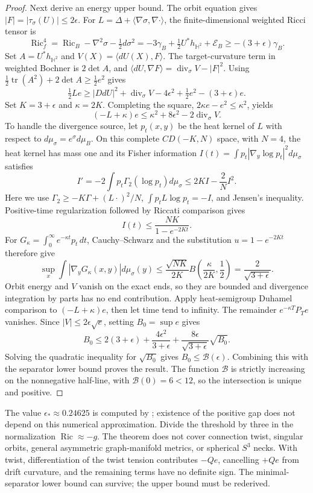 \documentclass[a4paper,11pt]{article}
\numberwithin{equation}{section}
\theoremstyle{definition}
\newcommand{\Ric}{\operatorname{Ric}}
\newcommand{\tr}{\operatorname{tr}}
\begin{document}
\begin{proof}
Next derive an energy upper bound.
The orbit equation gives $|F|=|\tau_\sigma(U)|\le2\epsilon$.
For $L=\Delta+\langle\nabla\sigma,\nabla\cdot\rangle$, the finite-dimensional weighted Ricci tensor is
\[
 \Ric^4_f=\Ric_B-\nabla^2\sigma-\tfrac12d\sigma^2
 =-3\gamma_B+\tfrac12U^*h_{\mathbb H^2}+\mathcal E_B
 \ge-(3+\epsilon)\gamma_B.
\]
Set $A=U^*h_{\mathbb H^2}$ and $V(X)=\langle dU(X),F\rangle$.
The target-curvature term in weighted Bochner is $2\det A$, and
$\langle dU,\nabla F\rangle=\operatorname{div}_\sigma V-|F|^2$.
Using $\frac12\tr(A^2)+2\det A\ge\frac12e^2$ gives
\[
 \tfrac12Le\ge |DdU|^2+\operatorname{div}_\sigma V
   -4\epsilon^2+\tfrac12e^2-(3+\epsilon)e.
\]
Set $K=3+\epsilon$ and $\kappa=2K$. Completing the square, $2\kappa e-e^2\le\kappa^2$, yields
\[
 (-L+\kappa)e\le\kappa^2+8\epsilon^2
                 -2\operatorname{div}_\sigma V.
\]
To handle the divergence source, let $p_t(x,y)$ be the heat kernel of $L$ with respect to $d\mu_\sigma=e^\sigma d\mu_B$.
On this complete $CD(-K,N)$ space, with $N=4$, the heat kernel has mass one and its Fisher information
$I(t)=\int p_t|\nabla_y\log p_t|^2d\mu_\sigma$ satisfies
\[
 I'=-2\int p_t\Gamma_2(\log p_t)d\mu_\sigma
 \le2KI-\frac2N I^2.
\]
Here we use $\Gamma_2\ge-K\Gamma+(L\cdot)^2/N$,
$\int p_tL\log p_t=-I$, and Jensen's inequality.
Positive-time regularization followed by Riccati comparison gives
\[
 I(t)\le\frac{NK}{1-e^{-2Kt}}.
\]
For $G_\kappa=\int_0^\infty e^{-\kappa t}p_t\,dt$, Cauchy--Schwarz and the substitution $u=1-e^{-2Kt}$ therefore give
\[
 \sup_x\int|\nabla_yG_\kappa(x,y)|d\mu_\sigma(y)
 \le\frac{\sqrt{NK}}{2K}
       B\!\left(\frac{\kappa}{2K},\frac12\right)
 =\frac2{\sqrt{3+\epsilon}}.
\]
Orbit energy and $V$ vanish on the exact ends, so they are bounded and divergence integration by parts has no end contribution.
Apply heat-semigroup Duhamel comparison to $(-L+\kappa)e$, then let time tend to infinity.
The remainder $e^{-\kappa T}P_Te$ vanishes.
Since $|V|\le2\epsilon\sqrt e$, setting $B_0=\sup e$ gives
\[
 B_0\le2(3+\epsilon)+\frac{4\epsilon^2}{3+\epsilon}
            +\frac{8\epsilon}{\sqrt{3+\epsilon}}\sqrt{B_0}.
\]
Solving the quadratic inequality for $\sqrt{B_0}$ gives $B_0\le\mathcal B(\epsilon)$.
Combining this with the separator lower bound proves the result.
The function $\mathcal B$ is strictly increasing on the nonnegative half-line, with $\mathcal B(0)=6<12$, so the intersection is unique and positive.
\end{proof}
The value $\epsilon_*\approx0.24625$ is computed by ; existence of the positive gap does not depend on this numerical approximation.
Divide the threshold by three in the normalization $\Ric\approx-g$.
The theorem does not cover connection twist, singular orbits, general asymmetric graph-manifold metrics, or spherical $S^3$ necks.
With twist, differentiation of the twist tension contributes $-Qe$, cancelling $+Qe$ from drift curvature, and the remaining terms have no definite sign.
The minimal-separator lower bound can survive; the upper bound must be rederived.
\end{document}
